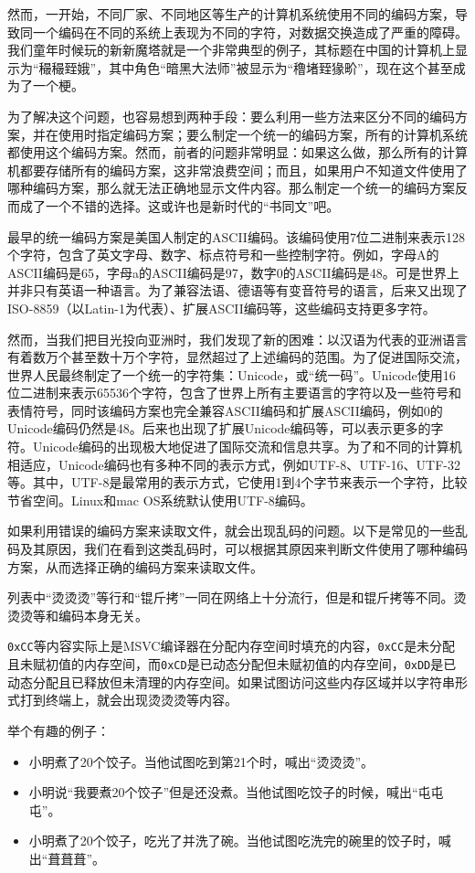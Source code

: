 然而，一开始，不同厂家、不同地区等生产的计算机系统使用不同的编码方案，导致同一个编码在不同的系统上表现为不同的字符，对数据交换造成了严重的障碍。我们童年时候玩的新新魔塔就是一个非常典型的例子，其标题在中国的计算机上显示为“穝穝臸娥”，其中角色“暗黑大法师”被显示为“穞堵臸猭畍”，现在这个甚至成为了一个梗。

为了解决这个问题，也容易想到两种手段：要么利用一些方法来区分不同的编码方案，并在使用时指定编码方案；要么制定一个统一的编码方案，所有的计算机系统都使用这个编码方案。然而，前者的问题非常明显：如果这么做，那么所有的计算机都要存储所有的编码方案，这非常浪费空间；而且，如果用户不知道文件使用了哪种编码方案，那么就无法正确地显示文件内容。那么制定一个统一的编码方案反而成了一个不错的选择。这或许也是新时代的“书同文”吧。

最早的统一编码方案是美国人制定的ASCII编码。该编码使用7位二进制来表示128个字符，包含了英文字母、数字、标点符号和一些控制字符。例如，字母A的ASCII编码是65，字母a的ASCII编码是97，数字0的ASCII编码是48。可是世界上并非只有英语一种语言。为了兼容法语、德语等有变音符号的语言，后来又出现了ISO-8859（以Latin-1为代表）、扩展ASCII编码等，这些编码支持更多字符。

然而，当我们把目光投向亚洲时，我们发现了新的困难：以汉语为代表的亚洲语言有着数万个甚至数十万个字符，显然超过了上述编码的范围。为了促进国际交流，世界人民最终制定了一个统一的字符集：Unicode，或“统一码”。Unicode使用16位二进制来表示65536个字符，包含了世界上所有主要语言的字符以及一些符号和表情符号，同时该编码方案也完全兼容ASCII编码和扩展ASCII编码，例如0的Unicode编码仍然是48。后来也出现了扩展Unicode编码等，可以表示更多的字符。Unicode编码的出现极大地促进了国际交流和信息共享。为了和不同的计算机相适应，Unicode编码也有多种不同的表示方式，例如UTF-8、UTF-16、UTF-32等。其中，UTF-8是最常用的表示方式，它使用1到4个字节来表示一个字符，比较节省空间。Linux和mac OS系统默认使用UTF-8编码。

如果利用错误的编码方案来读取文件，就会出现乱码的问题。以下是常见的一些乱码及其原因，我们在看到这类乱码时，可以根据其原因来判断文件使用了哪种编码方案，从而选择正确的编码方案来读取文件。

\begin{note}
  列表中“烫烫烫”等行和“锟斤拷”一同在网络上十分流行，但是和锟斤拷等不同。烫烫烫等和编码本身无关。
  
  \texttt{0xCC}等内容实际上是MSVC编译器在分配内存空间时填充的内容，\texttt{0xCC}是未分配且未赋初值的内存空间，而\texttt{0xCD}是已动态分配但未赋初值的内存空间，\texttt{0xDD}是已动态分配且已释放但未清理的内存空间。如果试图访问这些内存区域并以字符串形式打到终端上，就会出现烫烫烫等内容。

  举个有趣的例子：
  \begin{itemize}
    \item 小明煮了20个饺子。当他试图吃到第21个时，喊出“烫烫烫”。
    \item 小明说“我要煮20个饺子”但是还没煮。当他试图吃饺子的时候，喊出“屯屯屯”。
    \item 小明煮了20个饺子，吃光了并洗了碗。当他试图吃洗完的碗里的饺子时，喊出“葺葺葺”。
  \end{itemize}
\end{note}

